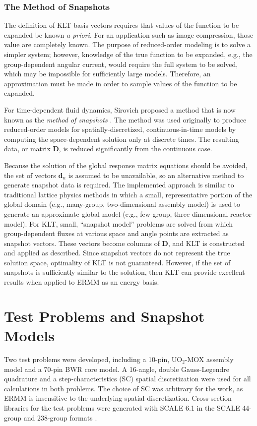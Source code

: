 \documentclass[5p,times,twocolumn,10pt]{elsarticle}
\begin{document}
    \subsubsection{The Method of Snapshots}


    The definition of KLT basis vectors requires that values of the function to
    be expanded be known {\it a priori}.  For an application such as image
    compression, those value are completely known.  The purpose of
    reduced-order modeling is to solve a simpler system; however, knowledge of
    the true function to be expanded, e.g., the group-dependent angular
    current, would require the full system to be solved, which may be
    impossible for sufficiently large models. Therefore, an approximation must
    be made in order to sample values of the function to be expanded.

    For  time-dependent fluid dynamics, Sirovich proposed a method
    \cite{Sirovich1987} that is now known as the {\it method of snapshots}
    \cite{Buchan2013}. The method was used originally to produce reduced-order
    models for spatially-discretized, continuous-in-time models by computing
    the space-dependent solution only at discrete times. The resulting data, or
    matrix $\mathbf{D}$, is reduced significantly from the continuous case.

    Because the solution of the global response matrix equations should be
    avoided,
    the set of vectors $\mathbf{d}_n$ is assumed to be unavailable, so
    an alternative method to generate snapshot data is required. The implemented
    approach is similar to traditional lattice physics methods in which
    a small, representative portion of the global domain (e.g., many-group,
    two-dimensional assembly model) is used to generate
    an approximate global model (e.g., few-group, three-dimensional
    reactor model).  For KLT, small, ``snapshot model'' problems
    are solved from which group-dependent fluxes at various space and angle
    points are extracted as snapshot vectors.  These vectors become
    columns of $\mathbf{D}$, and KLT is constructed and applied as
    described.  Since snapshot vectors do not represent the
    true solution space, optimality of KLT is not guaranteed.
    However, if the set of snapshots is sufficiently similar to the
    solution, then KLT can provide excellent results when applied
    to ERMM as an energy basis.

    \section{Test Problems and Snapshot Models}
    \label{sec:testproblems}
    Two test problems were developed, including a 10-pin, UO$_2$-MOX assembly
    model and a 70-pin BWR core model. A 16-angle, double Gauss-Legendre
    quadrature and a step-characteristics (SC) spatial discretization were used
    for all calculations in both problems.  The choice of SC was arbitrary for
    the work, as ERMM is insensitive to the underlying spatial discretization.
    Cross-section libraries for the test problems were generated with SCALE 6.1
    in the SCALE 44-group and 238-group formats \cite{Scale}.
\end{document}
